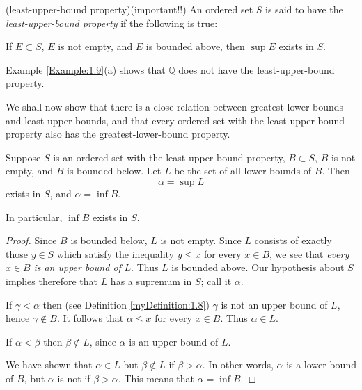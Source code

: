 \begin{myDefinition}(least-upper-bound property)(important!!)\label{myDefinition:1.10}
An ordered set $S$ is said to have the \emph{least-upper-bound property}
if the following is true:

If $E \subset S$, $E$ is not empty, and $E$ is bounded above, then $\sup E$ exists in $S$.
\end{myDefinition}

Example \ref{Example:1.9}(a) shows that $\mathbb{Q}$ does not have the least-upper-bound property.

We shall now show that there is a close relation between greatest lower
bounds and least upper bounds, and that every ordered set with the least-upper-bound property also has the greatest-lower-bound property.

\begin{thm}\label{thm:1.11}
Suppose $S$ is an ordered set with the least-upper-bound property,
$B \subset S$, $B$ is not empty, and $B$ is bounded below. Let $L$ be the set of all lower
bounds of $B$. Then
\begin{equation*}
    \alpha = \sup L
\end{equation*}
exists in $S$, and $\alpha = \inf B$.

In particular, $\inf B$ exists in $S$.
\end{thm}

\begin{proof}
Since $B$ is bounded below, $L$ is not empty. Since $L$ consists of
exactly those $y \in S$ which satisfy the inequality $y \leq x$ for every $x \in B$, we
see that \emph{every} $x \in B$ \emph{is an upper bound of} $L$. Thus $L$ is bounded above.
Our hypothesis about $S$ implies therefore that $L$ has a supremum in $S$;
call it $\alpha$.

If $\gamma <\alpha$ then (see Definition \ref{myDefinition:1.8}) $\gamma$ is not an upper bound of $L$,
hence $\gamma \not\in B$. It follows that $\alpha \leq x$ for every $x \in B$. Thus $\alpha \in L$.

If $\alpha < \beta$ then $\beta \not\in L$, since $\alpha$ is an upper bound of $L$.

We have shown that $\alpha \in L$ but $\beta \not\in  L$ if $\beta>\alpha$. In other words, $\alpha$
is a lower bound of $B$, but $\alpha$ is not if $\beta > \alpha$. This means that $\alpha = \inf B$.
\end{proof}


